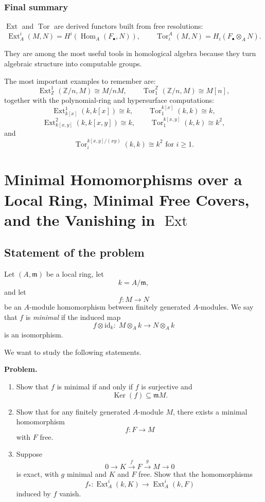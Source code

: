 \documentclass[12pt,a4paper]{article}
\theoremstyle{notespace}
\DeclareMathOperator{\Hom}{Hom}
\DeclareMathOperator{\Ker}{Ker}
\DeclareMathOperator{\Tor}{Tor}
\DeclareMathOperator{\Ext}{Ext}
\newcommand{\m}{\mathfrak m}
\begin{document}
\subsubsection{Final summary}

\(\Ext\) and \(\Tor\) are derived functors built from free resolutions:
\[
\Ext_A^i(M,N)=H^i(\Hom_A(F_\bullet,N)),
\qquad
\Tor_i^A(M,N)=H_i(F_\bullet\otimes_A N).
\]

They are among the most useful tools in homological algebra because they turn algebraic structure into computable groups.

The most important examples to remember are:
\[
\Ext_\mathbb Z^1(\mathbb Z/n,M)\cong M/nM,
\qquad
\Tor_1^\mathbb Z(\mathbb Z/n,M)\cong M[n],
\]
together with the polynomial-ring and hypersurface computations:
\[
\Ext_{k[x]}^1(k,k[x])\cong k,
\qquad
\Tor_1^{k[x]}(k,k)\cong k,
\]
\[
\Ext_{k[x,y]}^2(k,k[x,y])\cong k,
\qquad
\Tor_1^{k[x,y]}(k,k)\cong k^2,
\]
and
\[
\Tor_i^{k[x,y]/(xy)}(k,k)\cong k^2 \text{ for } i\ge 1.
\]	
	
\section{Minimal Homomorphisms over a Local Ring, Minimal Free Covers, and the Vanishing in \(\Ext\)}

\subsection{Statement of the problem}

Let \((A,\m)\) be a local ring, let
\[
k=A/\m,
\]
and let
\[
f:M\to N
\]
be an \(A\)-module homomorphism between finitely generated \(A\)-modules. We say that \(f\) is \emph{minimal} if the induced map
\[
f\otimes \mathrm{id}_k:\; M\otimes_A k \longrightarrow N\otimes_A k
\]
is an isomorphism.

We want to study the following statements.

\medskip

\textbf{Problem.}
\begin{enumerate}[label=\textnormal{(\alph*)},leftmargin=2em]
	\item Show that \(f\) is minimal if and only if \(f\) is surjective and
	\[
	\Ker(f)\subseteq \m M.
	\]
	\item Show that for any finitely generated \(A\)-module \(M\), there exists a minimal homomorphism
	\[
	f:F\to M
	\]
	with \(F\) free.
	\item Suppose
	\[
	0\longrightarrow K \xrightarrow{\,f\,} F \xrightarrow{\,g\,} M \longrightarrow 0
	\]
	is exact, with \(g\) minimal and \(K\) and \(F\) free. Show that the homomorphisms
	\[
	f_*:\Ext_A^i(k,K)\longrightarrow \Ext_A^i(k,F)
	\]
	induced by \(f\) vanish.
\end{enumerate}
\end{document}
